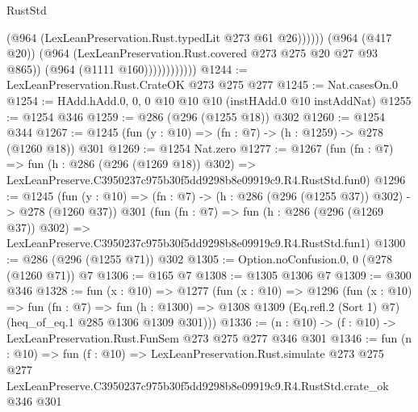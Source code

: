 \begin{lexlean}{RustStd}
\begin{coremodule}
                                (@964 (LexLeanPreservation.Rust.typedLit @273 @61 @26))))))
                        (@964 (@417 @20))
                        (@964 (LexLeanPreservation.Rust.covered @273 @275 @20 @27 @93 @865))
                        (@964 (@1111 @160))))))))))))
@1244 := LexLeanPreservation.Rust.CrateOK @273 @275 @277
@1245 := Nat.casesOn.{0}
@1254 := HAdd.hAdd.{0, 0, 0} @10 @10 @10 (instHAdd.{0} @10 instAddNat)
@1255 := @1254 @346
@1259 := @286 (@296 (@1255 @18)) @302
@1260 := @1254 @344
@1267 := @1245 (fun (y : @10) => (fn : @7) -> (h : @1259) -> @278 (@1260 @18)) @301
@1269 := @1254 Nat.zero
@1277 := @1267
    (fun (fn : @7) =>
    fun (h : @286 (@296 (@1269 @18)) @302) =>
    LexLeanPreserve.C3950237c975b30f5dd9298b8e09919c9.R4.RustStd.fun0)
@1296 := @1245
    (fun (y : @10) => (fn : @7) -> (h : @286 (@296 (@1255 @37)) @302) -> @278 (@1260 @37))
    @301
    (fun (fn : @7) =>
    fun (h : @286 (@296 (@1269 @37)) @302) =>
    LexLeanPreserve.C3950237c975b30f5dd9298b8e09919c9.R4.RustStd.fun1)
@1300 := @286 (@296 (@1255 @71)) @302
@1305 := Option.noConfusion.{0, 0} (@278 (@1260 @71)) @7
@1306 := @165 @7
@1308 := @1305 @1306 @7
@1309 := @300 @346
@1328 := fun (x : @10) =>
  @1277
    (fun (x : @10) =>
    @1296
      (fun (x : @10) =>
      fun (fn : @7) =>
      fun (h : @1300) =>
      @1308 @1309 (Eq.refl.{2} (Sort 1) @7) (heq_of_eq.{1} @285 @1306 @1309 @301)))
@1336 := (n : @10) -> (f : @10) -> LexLeanPreservation.Rust.FunSem @273 @275 @277 @346 @301
@1346 := fun (n : @10) =>
  fun (f : @10) =>
  LexLeanPreservation.Rust.simulate
    @273
    @275
    @277
    LexLeanPreserve.C3950237c975b30f5dd9298b8e09919c9.R4.RustStd.crate_ok
    @346
    @301
\end{coremodule}
\end{lexlean}
